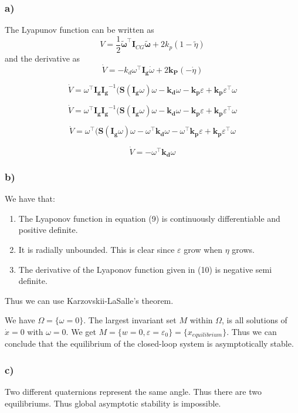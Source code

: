 \subsubsection*{a)}
The Lyapunov function can be written as 
 \begin{equation}
	 V = \frac{1}{2} \tilde{\boldsymbol{\omega}}^{\top} \mathbf{I}_{CG}\tilde{\boldsymbol{\omega}} + 2 k_p (1-\tilde{\eta})
 \end{equation}
and the derivative as 
\begin{equation}
	\dot{V} = -k_d \omega^{\top} \mathbf{I_g} \dot\omega
 + 2\mathbf{k_P}(-\dot\eta)
\end{equation}

\begin{equation}
	\dot{V} = \omega^{\top}\mathbf{I_g}\mathbf{I_g}^{-1}(\mathbf{S}(\mathbf{I_g}\omega)\omega-\mathbf{k_d}\omega
 -\mathbf{k_p}\varepsilon + \mathbf{k_p}\varepsilon^{\top}\omega
\end{equation}

\begin{equation}
	\dot{V} = \omega^{\top}\mathbf{I_g}\mathbf{I_g}^{-1}(\mathbf{S}(\mathbf{I_g}\omega)\omega-\mathbf{k_d}\omega
 -\mathbf{k_p}\varepsilon + \mathbf{k_p}\varepsilon^{\top}\omega
\end{equation}


\begin{equation}
	\dot{V} = \omega^{\top}(\mathbf{S}(\mathbf{I_g}\omega)\omega-\omega^{\top}\mathbf{k_d}\omega
 -\omega^{\top}\mathbf{k_p}\varepsilon + \mathbf{k_p}\varepsilon^{\top}\omega
\end{equation}

\begin{equation}
	\dot{V} = -\omega^{\top}\mathbf{k_d}\omega
\end{equation}


\subsubsection*{b)}
We have that:
\begin{enumerate}
    \item The Lyaponov function in equation (9) is continuously differentiable and positive definite.
    \item It is radially unbounded. This is clear since $\varepsilon$ grow when $\eta$ grows.
    \item The derivative of the Lyaponov function given in (10) is negative semi definite. 
\end{enumerate} 
Thus we can use Karzovskii-LaSalle's theorem. 

We have $\Omega = \{\omega=0\}$. 
The largest invariant set $M$ within $\Omega$, is all solutions of $\dot{x} = 0$ with $\omega=0$. 
We get $M=\{w=0, \varepsilon=\varepsilon_0\}=\{x_{equilibrium}\}$.  Thus we can conclude that the equilibrium of the closed-loop system is asymptotically stable.

\subsubsection*{c)}
Two different quaternions represent the same angle. Thus there are two equilibriums. Thus global asymptotic stability is impossible. 